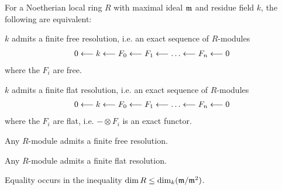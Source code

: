 \documentclass[a4paper,parskip=half,numbers=enddot, DIV=12]{scrreprt}
\begin{document}
\begin{thm}[Serre] 
    For a Noetherian local ring $R$ with maximal ideal $\mathfrak{m}$ and residue field $k$, the following are equivalent:
    \begin{alphanumerate}
    \item 
        $k$ admits a finite free resolution, i.e. an exact sequence of $R$-modules
            \begin{align*}
                0 \lmorphism k \lmorphism F_0 \lmorphism F_1 \lmorphism \ldots \lmorphism F_n \lmorphism 0
            \end{align*}
        where the $F_i$ are free.
    \item 
        $k$ admits a finite flat resolution, i.e. an exact sequence of $R$-modules
            \begin{align*}
                0 \lmorphism k \lmorphism F_0 \lmorphism F_1 \lmorphism \ldots \lmorphism F_n \lmorphism 0
            \end{align*}
        where the $F_i$ are flat, i.e. $-\otimes F_i$ is an exact functor.
    \item 
        Any $R$-module admits a finite free resolution.
    \item 
        Any $R$-module admits a finite flat resolution.
    \item 
        Equality occurs in the inequality $\dim R \leq \dim_k (\mathfrak{m}/\mathfrak{m}^2)$.
    \end{alphanumerate}
\end{thm}
\end{document}
